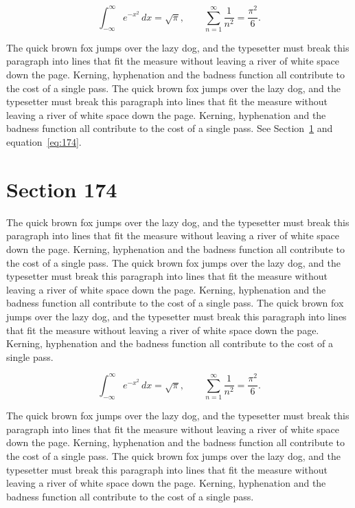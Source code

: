 \documentclass{article}
\begin{document}
\begin{equation}\label{eq:173}
\int_{-\infty}^{\infty} e^{-x^{2}}\,dx = \sqrt{\pi}, \qquad
\sum_{n=1}^{\infty} \frac{1}{n^{2}} = \frac{\pi^{2}}{6}.
\end{equation}

The quick brown fox jumps over the lazy dog, and the typesetter must break this paragraph into lines that fit the measure without leaving a river of white space down the page. Kerning, hyphenation and the badness function all contribute to the cost of a single pass. The quick brown fox jumps over the lazy dog, and the typesetter must break this paragraph into lines that fit the measure without leaving a river of white space down the page. Kerning, hyphenation and the badness function all contribute to the cost of a single pass. 
See Section~\ref{sec:174} and equation~\eqref{eq:174}.
\section{Section 174}
\label{sec:174}
The quick brown fox jumps over the lazy dog, and the typesetter must break this paragraph into lines that fit the measure without leaving a river of white space down the page. Kerning, hyphenation and the badness function all contribute to the cost of a single pass. The quick brown fox jumps over the lazy dog, and the typesetter must break this paragraph into lines that fit the measure without leaving a river of white space down the page. Kerning, hyphenation and the badness function all contribute to the cost of a single pass. The quick brown fox jumps over the lazy dog, and the typesetter must break this paragraph into lines that fit the measure without leaving a river of white space down the page. Kerning, hyphenation and the badness function all contribute to the cost of a single pass. 

\begin{equation}\label{eq:174}
\int_{-\infty}^{\infty} e^{-x^{2}}\,dx = \sqrt{\pi}, \qquad
\sum_{n=1}^{\infty} \frac{1}{n^{2}} = \frac{\pi^{2}}{6}.
\end{equation}

The quick brown fox jumps over the lazy dog, and the typesetter must break this paragraph into lines that fit the measure without leaving a river of white space down the page. Kerning, hyphenation and the badness function all contribute to the cost of a single pass. The quick brown fox jumps over the lazy dog, and the typesetter must break this paragraph into lines that fit the measure without leaving a river of white space down the page. Kerning, hyphenation and the badness function all contribute to the cost of a single pass. 
\end{document}
